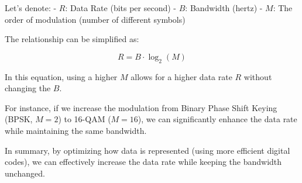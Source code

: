 Let's denote:
- \( R \): Data Rate (bits per second)
- \( B \): Bandwidth (hertz)
- \( M \): The order of modulation (number of different symbols)

The relationship can be simplified as:

\[
R = B \cdot \log_2(M)
\]

In this equation, using a higher \( M \) allows for a higher data rate \( R \) without changing the \( B \).

For instance, if we increase the modulation from Binary Phase Shift Keying (BPSK, \( M=2 \)) to 16-QAM (\( M=16 \)), we can significantly enhance the data rate while maintaining the same bandwidth.

In summary, by optimizing how data is represented (using more efficient digital codes), we can effectively increase the data rate while keeping the bandwidth unchanged. 

